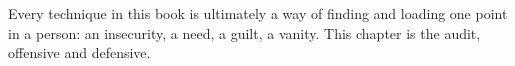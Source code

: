 
\begin{chapterblurb}
Every technique in this book is ultimately a way of finding and loading one point in a person: an insecurity, a need, a guilt, a vanity. This chapter is the audit, offensive and defensive.
\end{chapterblurb}
